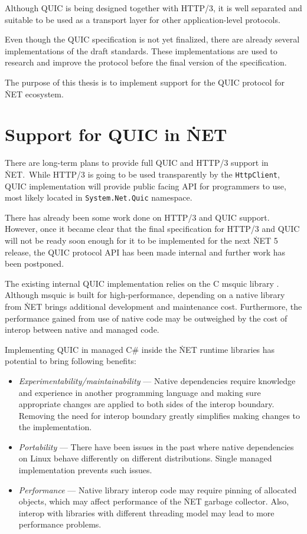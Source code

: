 Although QUIC is being designed together with HTTP/3, it is well separated and suitable to be used
as a transport layer for other application-level protocols.

Even though the QUIC specification is not yet finalized, there are already several implementations
of the draft standards. These implementations are used to research and improve the protocol before
the final version of the specification.

The purpose of this thesis is to implement support for the QUIC protocol for \.NET ecosystem.

\section{Support for QUIC in \.NET}

There are long-term plans to provide full QUIC and HTTP/3 support in \.NET.\ While HTTP/3 is going to
be used transparently by the \texttt{HttpClient}, QUIC implementation will provide public facing API
for programmers to use, most likely located in \texttt{System.Net.Quic} namespace.

There has already been some work done on HTTP/3 and QUIC support. However, once it became clear that
the final specification for HTTP/3 and QUIC will not be ready soon enough for it to be implemented
for the next \.NET 5 release, the QUIC protocol API has been made internal and further work has been
postponed.

The existing internal QUIC implementation relies on the C msquic library . Although
msquic is built for high-performance, depending on a native library from \.NET brings additional
development and maintenance cost. Furthermore, the performance gained from use of native code may be
outweighed by the cost of interop between native and managed code.

Implementing QUIC in managed C\# inside the \.NET runtime libraries has potential to bring following
benefits:

\begin{itemize}
  \item \textit{Experimentability/maintainability} ---
    Native dependencies require knowledge and experience in another programming language and making
    sure appropriate changes are applied to both sides of the interop boundary. Removing the need
    for interop boundary greatly simplifies making changes to the implementation.

  \item \textit{Portability} ---
    There have been issues in the past where native dependencies on Linux behave differently on
    different distributions. Single managed implementation prevents such issues.

  \item \textit{Performance} ---
    Native library interop code may require pinning of allocated objects, which may affect
    performance of the \.NET garbage collector. Also, interop with libraries with different
    threading model may lead to more performance problems. 
\end{itemize}

